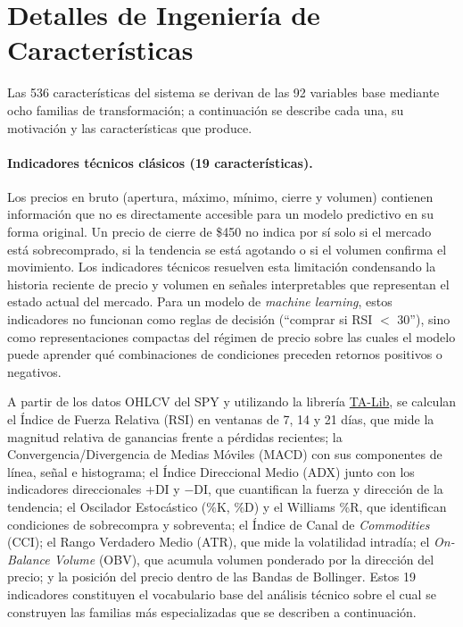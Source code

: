 
\section{Detalles de Ingenier\'ia de Caracter\'isticas}
\label{sec:appendix_features}

Las 536 caracter\'isticas del sistema se derivan de las 92 variables base mediante ocho familias de transformaci\'on; a continuaci\'on se describe cada una, su motivaci\'on y las caracter\'isticas que produce.

\paragraph{Indicadores t\'ecnicos cl\'asicos (19 caracter\'isticas).}
Los precios en bruto (apertura, m\'aximo, m\'inimo, cierre y volumen) contienen informaci\'on que no es directamente accesible para un modelo predictivo en su forma original. Un precio de cierre de \$450 no indica por s\'i solo si el mercado est\'a sobrecomprado, si la tendencia se est\'a agotando o si el volumen confirma el movimiento. Los indicadores t\'ecnicos resuelven esta limitaci\'on condensando la historia reciente de precio y volumen en se\~nales interpretables que representan el estado actual del mercado. Para un modelo de \textit{machine learning}, estos indicadores no funcionan como reglas de decisi\'on (``comprar si RSI $<$ 30''), sino como representaciones compactas del r\'egimen de precio sobre las cuales el modelo puede aprender qu\'e combinaciones de condiciones preceden retornos positivos o negativos.

A partir de los datos OHLCV del SPY y utilizando la librer\'ia \hyperlink{glos:talib}{TA-Lib}, se calculan el \'Indice de Fuerza Relativa (RSI) en ventanas de 7, 14 y 21 d\'ias, que mide la magnitud relativa de ganancias frente a p\'erdidas recientes; la Convergencia/Divergencia de Medias M\'oviles (MACD) con sus componentes de l\'inea, se\~nal e histograma; el \'Indice Direccional Medio (ADX) junto con los indicadores direccionales +DI y $-$DI, que cuantifican la fuerza y direcci\'on de la tendencia; el Oscilador Estoc\'astico (\%K, \%D) y el Williams \%R, que identifican condiciones de sobrecompra y sobreventa; el \'Indice de Canal de \textit{Commodities} (CCI); el Rango Verdadero Medio (ATR), que mide la volatilidad intrad\'ia; el \textit{On-Balance Volume} (OBV), que acumula volumen ponderado por la direcci\'on del precio; y la posici\'on del precio dentro de las Bandas de Bollinger. Estos 19 indicadores constituyen el vocabulario base del an\'alisis t\'ecnico sobre el cual se construyen las familias m\'as especializadas que se describen a continuaci\'on.

